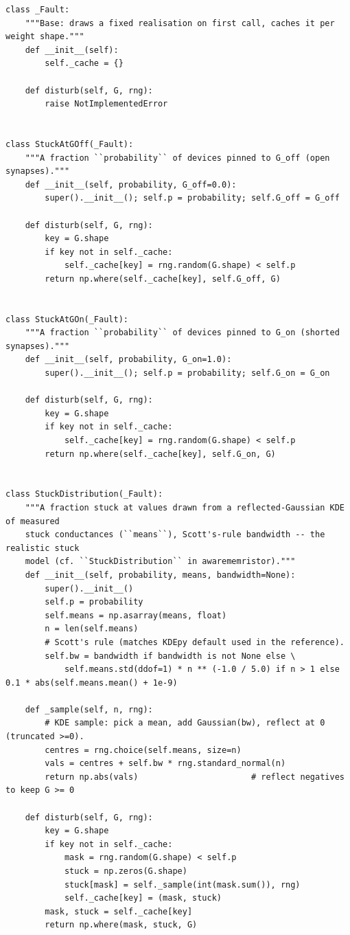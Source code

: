 \begin{lstlisting}[caption={mrl\_trace/device\_faults.py},label={lst:siox-src-device_faults}]
class _Fault:
    """Base: draws a fixed realisation on first call, caches it per weight shape."""
    def __init__(self):
        self._cache = {}

    def disturb(self, G, rng):
        raise NotImplementedError


class StuckAtGOff(_Fault):
    """A fraction ``probability`` of devices pinned to G_off (open synapses)."""
    def __init__(self, probability, G_off=0.0):
        super().__init__(); self.p = probability; self.G_off = G_off

    def disturb(self, G, rng):
        key = G.shape
        if key not in self._cache:
            self._cache[key] = rng.random(G.shape) < self.p
        return np.where(self._cache[key], self.G_off, G)


class StuckAtGOn(_Fault):
    """A fraction ``probability`` of devices pinned to G_on (shorted synapses)."""
    def __init__(self, probability, G_on=1.0):
        super().__init__(); self.p = probability; self.G_on = G_on

    def disturb(self, G, rng):
        key = G.shape
        if key not in self._cache:
            self._cache[key] = rng.random(G.shape) < self.p
        return np.where(self._cache[key], self.G_on, G)


class StuckDistribution(_Fault):
    """A fraction stuck at values drawn from a reflected-Gaussian KDE of measured
    stuck conductances (``means``), Scott's-rule bandwidth -- the realistic stuck
    model (cf. ``StuckDistribution`` in awarememristor)."""
    def __init__(self, probability, means, bandwidth=None):
        super().__init__()
        self.p = probability
        self.means = np.asarray(means, float)
        n = len(self.means)
        # Scott's rule (matches KDEpy default used in the reference).
        self.bw = bandwidth if bandwidth is not None else \
            self.means.std(ddof=1) * n ** (-1.0 / 5.0) if n > 1 else 0.1 * abs(self.means.mean() + 1e-9)

    def _sample(self, n, rng):
        # KDE sample: pick a mean, add Gaussian(bw), reflect at 0 (truncated >=0).
        centres = rng.choice(self.means, size=n)
        vals = centres + self.bw * rng.standard_normal(n)
        return np.abs(vals)                       # reflect negatives to keep G >= 0

    def disturb(self, G, rng):
        key = G.shape
        if key not in self._cache:
            mask = rng.random(G.shape) < self.p
            stuck = np.zeros(G.shape)
            stuck[mask] = self._sample(int(mask.sum()), rng)
            self._cache[key] = (mask, stuck)
        mask, stuck = self._cache[key]
        return np.where(mask, stuck, G)



\end{lstlisting}
